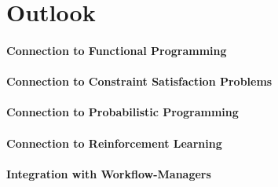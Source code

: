 \documentclass[english]{article}
\begin{document}
\section{Outlook}
\paragraph{Connection to Functional Programming}
\paragraph{Connection to Constraint Satisfaction Problems}
\paragraph{Connection to Probabilistic Programming}
\paragraph{Connection to Reinforcement Learning}
\paragraph{Integration with Workflow-Managers}


\printbibliography
\end{document}
